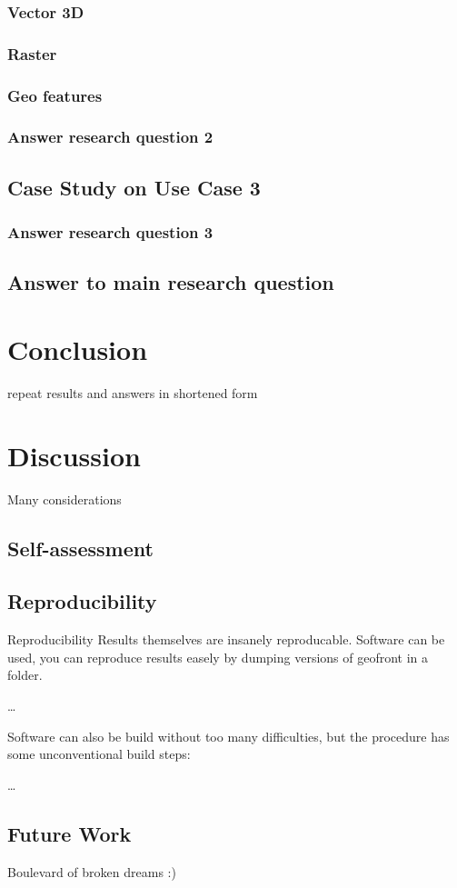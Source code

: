 \subsection{Vector 3D}

\subsection{Raster}

\subsection{Geo features}

\subsection*{Answer research question 2}

\section{Case Study on Use Case 3}%

\subsection*{Answer research question 3}

\section{Answer to main research question}

\chapter{Conclusion}%
repeat results and answers in shortened form

\chapter{Discussion}%
Many considerations

\section{Self-assessment}


\section{Reproducibility}
Reproducibility
Results themselves are insanely reproducable. 
Software can be used, you can reproduce results easely by dumping versions of geofront in 
a folder.

\dots

Software can also be build without too many difficulties, but the procedure has some unconventional build steps: 

\dots

\section{Future Work}
Boulevard of broken dreams :) 
